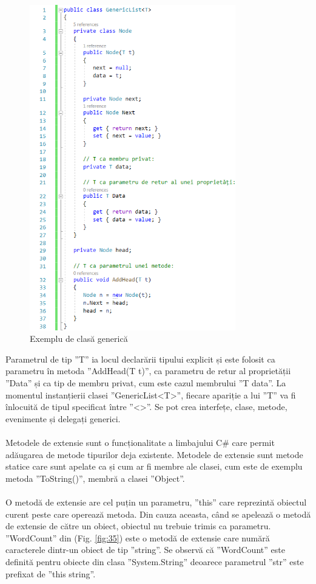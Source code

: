 \begin{figure}[!htb]
	\centering
	\includegraphics[width=0.8\textwidth]
	{../LaTeX/Images/csharp_generics.PNG}
	\caption{Exemplu de clasă generică}
	\label{fig:34}
\end{figure}

Parametrul de tip ”T” ia locul declarării tipului explicit și este folosit ca parametru în metoda ”AddHead(T t)”, ca parametru de retur al proprietății ”Data” și ca tip de membru privat, cum este cazul membrului ”T data”. La momentul instanțierii clasei ”GenericList<T>”, fiecare apariție a lui ”T” va fi înlocuită de tipul specificat între ”<>”.
Se pot crea interfețe, clase, metode, evenimente și delegați generici.
\\ \\
Metodele de extensie sunt o funcționalitate a limbajului C\# care permit adăugarea de metode tipurilor deja existente. Metodele de extensie sunt metode statice care sunt apelate ca și cum ar fi membre ale clasei, cum este de exemplu metoda ”ToString()”, membră a clasei ”Object”.
\\ \\
O metodă de extensie are cel puțin un parametru, ”this” care reprezintă obiectul curent peste care operează metoda. Din cauza aceasta, când se apelează o metodă de extensie de către un obiect, obiectul nu trebuie trimis ca parametru.
”WordCount” din (Fig. \ref{fig:35}) este o metodă de extensie care numără caracterele dintr-un obiect de tip ”string”. Se observă că ”WordCount” este definită pentru obiecte din clasa ”System.String” deoarece parametrul ”str” este prefixat de ”this string”.

